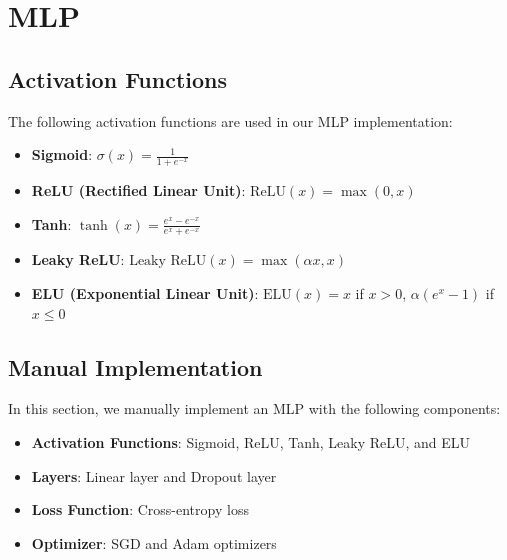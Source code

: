 \documentclass[a4paper,12pt]{article}
\begin{document}
\section{MLP}

\subsection{Activation Functions}
The following activation functions are used in our MLP implementation:

\begin{itemize}
    \item \textbf{Sigmoid}: \( \sigma(x) = \frac{1}{1 + e^{-x}} \)
    \item \textbf{ReLU (Rectified Linear Unit)}: \( \text{ReLU}(x) = \max(0, x) \)
    \item \textbf{Tanh}: \( \tanh(x) = \frac{e^x - e^{-x}}{e^x + e^{-x}} \)
    \item \textbf{Leaky ReLU}: \( \text{Leaky ReLU}(x) = \max(\alpha x, x) \)
    \item \textbf{ELU (Exponential Linear Unit)}: \( \text{ELU}(x) = x \) if \( x > 0 \), \( \alpha (e^x - 1) \) if \( x \leq 0 \)
\end{itemize}

\subsection{Manual Implementation}
In this section, we manually implement an MLP with the following components:

\begin{itemize}
    \item \textbf{Activation Functions}: Sigmoid, ReLU, Tanh, Leaky ReLU, and ELU
    \item \textbf{Layers}: Linear layer and Dropout layer
    \item \textbf{Loss Function}: Cross-entropy loss
    \item \textbf{Optimizer}: SGD and Adam optimizers
\end{itemize}
\end{document}

